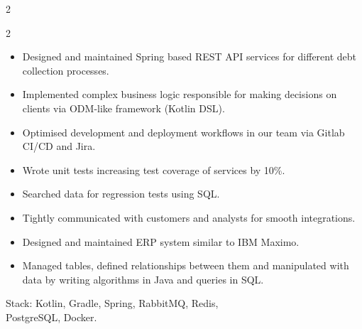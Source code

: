 \documentclass[12pt,a4paper,ragged2e,withhyper]{altacv}
\begin{document}
\begin{paracol}{2}
\begin{paracol}{2}

\begin{itemize}
\item Designed and maintained Spring based REST API services for different debt collection processes.
\item Implemented complex business logic responsible for making decisions on clients via ODM-like framework (Kotlin DSL).
\item Optimised development and deployment workflows in our team via Gitlab CI/CD and Jira.
\item Wrote unit tests increasing test coverage of services by 10\%.
\item Searched data for regression tests using SQL.
\item Tightly communicated with customers and analysts for smooth integrations.
\end{itemize}

\divider
\smallskip

\begin{itemize}
\item Designed and maintained ERP system similar to IBM Maximo.
\item Managed tables, defined relationships between them and manipulated with data by writing algorithms in Java and queries in SQL.
\end{itemize}

\medskip



\medskip

Stack: Kotlin, Gradle, Spring, RabbitMQ, Redis,\\ PostgreSQL, Docker.

\switchcolumn




\end{paracol}
\end{paracol}
\end{document}

